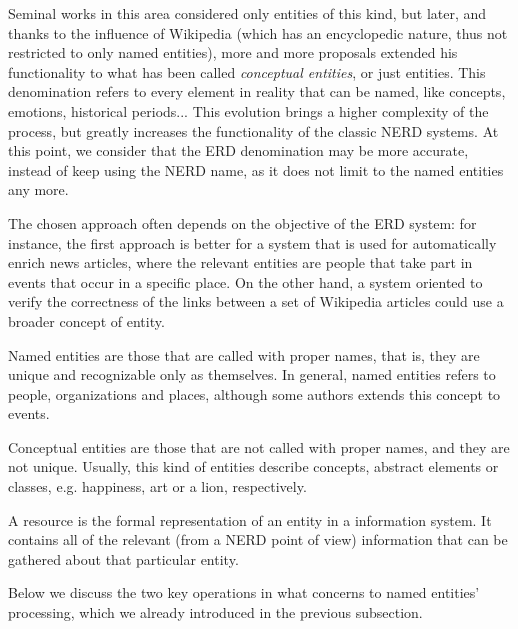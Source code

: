 Seminal works in this area considered only entities of this kind, but later, and thanks to the influence of Wikipedia (which has an encyclopedic nature, thus not restricted to only named entities), more and more proposals extended his functionality to what has been called \emph{conceptual entities}, or just entities. This denomination refers to every element in reality that can be named, like concepts, emotions, historical periods... This evolution brings a higher complexity of the process, but greatly increases the functionality of the classic NERD systems. At this point, we consider that the ERD denomination may be more accurate, instead of keep using the NERD name, as it does not limit to the named entities any more.

The chosen approach often depends on the objective of the ERD system: for instance, the first approach is better for a system that is used for automatically enrich news articles, where the relevant entities are people that take part in events that occur in a specific place. On the other hand, a system oriented to verify the correctness of the links between a set of Wikipedia articles could use a broader concept of entity.

\begin{defi}
Named entities are those that are called with proper names, that is, they are unique and recognizable only as themselves. In general, named entities refers to people, organizations and places, although some authors extends this concept to events.
\end{defi}

\begin{defi}
	Conceptual entities are those that are not called with proper names, and they are not unique. Usually, this kind of entities describe concepts, abstract elements or classes, e.g. happiness, art or a lion, respectively.
\end{defi}

\begin{defi}[{\bf Resource}]
A resource is the formal representation of an entity in a information system. It contains all of the relevant (from a NERD point of view) information that can be gathered about that particular entity.
\end{defi}

Below we discuss the two key operations in what concerns to named entities' processing, which we already introduced in the previous subsection.


